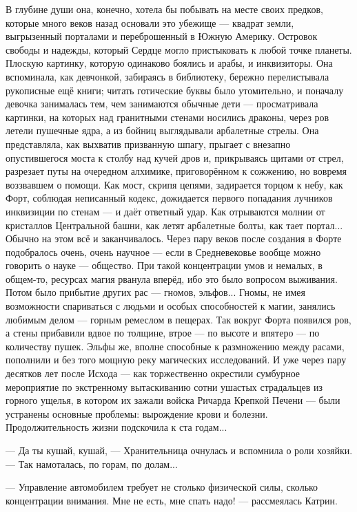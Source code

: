 В глубине души она, конечно, хотела бы побывать на месте своих предков, которые много веков назад основали это убежище ---
квадрат земли, выгрызенный порталами и переброшенный в Южную Америку.
Островок свободы и надежды, который Сердце могло пристыковать к любой точке планеты.
Плоскую картинку, которую одинаково боялись и арабы, и инквизиторы.
Она вспоминала, как девчонкой, забираясь в библиотеку, бережно перелистывала рукописные ещё книги;
читать готические буквы было утомительно, и поначалу девочка занималась тем, чем занимаются обычные дети ---
просматривала картинки, на которых над гранитными стенами носились драконы, через ров летели пушечные ядра,
а из бойниц выглядывали арбалетные стрелы. Она представляла, как выхватив призванную шпагу,
прыгает с внезапно опустившегося моста к столбу над кучей дров и, прикрываясь щитами от стрел,
разрезает путы на очередном алхимике, приговорённом к сожжению, но вовремя воззвавшем о помощи.
Как мост, скрипя цепями, задирается торцом к небу, как Форт, соблюдая неписанный кодекс,
дожидается первого попадания лучников инквизиции по стенам --- и даёт ответный удар.
Как отрываются молнии от кристаллов Центральной башни, как летят арбалетные болты, как тает портал...
Обычно на этом всё и заканчивалось. Через пару веков после создания в Форте подобралось очень, очень научное ---
если в Средневековье вообще можно говорить о науке --- общество. При такой концентрации умов и немалых, в общем-то,
ресурсах магия рванула вперёд, ибо это было вопросом выживания.
Потом было прибытие других рас --- гномов, эльфов...
Гномы, не имея возможности спариваться с людьми и особых способностей к магии,
занялись любимым делом --- горным ремеслом в пещерах. Так вокруг Форта появился ров, а стены прибавили вдвое по толщине,
втрое --- по высоте и впятеро --- по количеству пушек. Эльфы же, вполне способные к размножению между расами,
пополнили и без того мощную реку магических исследований. И уже через пару десятков лет после Исхода ---
как торжественно окрестили сумбурное мероприятие по экстренному вытаскиванию сотни ушастых страдальцев из горного ущелья,
в котором их зажали войска Ричарда Крепкой Печени --- были устранены основные проблемы:
вырождение крови и болезни. Продолжительность жизни подскочила к ста годам...

--- Да ты кушай, кушай, --- Хранительница очнулась и вспомнила о роли хозяйки. --- Так намоталась, по горам, по долам...

--- Управление автомобилем требует не столько физической силы, сколько концентрации внимания.
Мне не есть, мне спать надо! --- рассмеялась Катрин.

